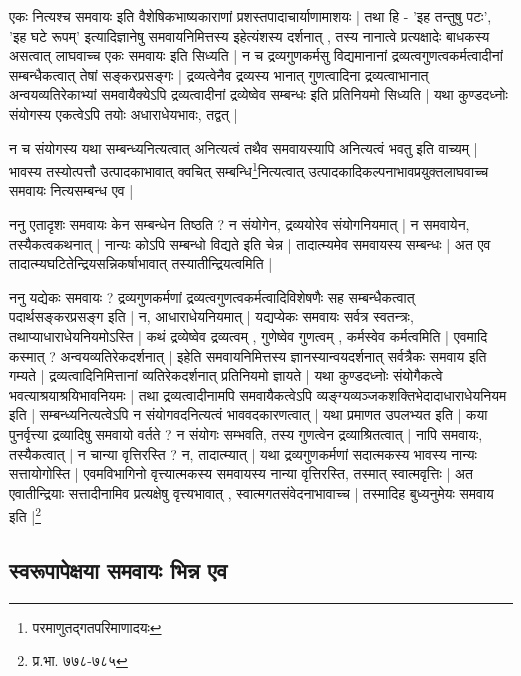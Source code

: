 एकः नित्यश्च समवायः इति वैशेषिकभाष्यकाराणां प्रशस्तपादाचार्याणामाशयः | तथा हि - 'इह तन्तुषु पटः', 'इह घटे रूपम्' इत्यादिज्ञानेषु समवायनिमित्तस्य इहेत्यंशस्य दर्शनात् , तस्य नानात्वे प्रत्यक्षादेः बाधकस्य असत्वात् लाघवाच्च एकः समवायः इति सिध्यति | न च द्रव्यगुणकर्मसु विद्यमानानां द्रव्यत्वगुणत्वकर्मत्वादीनां सम्बन्धैकत्वात् तेषां सङ्करप्रसङ्गः | द्रव्यत्वेनैव द्रव्यस्य भानात् गुणत्वादिना द्रव्यत्वाभानात् अन्वयव्यतिरेकाभ्यां समवायैक्येऽपि द्रव्यत्वादीनां द्रव्येष्वेव सम्बन्धः इति प्रतिनियमो सिध्यति | यथा कुण्डदध्नोः संयोगस्य एकत्वेऽपि तयोः अधाराधेयभावः, तद्वत् | 

न च संयोगस्य यथा सम्बन्ध्यनित्यत्वात् अनित्यत्वं तथैव समवायस्यापि अनित्यत्वं भवतु इति वाच्यम् | भावस्य तस्योत्पत्तौ उत्पादकाभावात् क्वचित् सम्बन्धि\footnote{परमाणुतद्गतपरिमाणादयः}नित्यत्वात् उत्पादकादिकल्पनाभावप्रयुक्तलाघवाच्च समवायः नित्यसम्बन्ध एव | 

ननु एतादृशः समवायः केन सम्बन्धेन तिष्ठति ? न संयोगेन, द्रव्ययोरेव संयोगनियमात् | न समवायेन, तस्यैकत्वकथनात् | नान्यः कोऽपि सम्बन्धो विद्यते इति चेन्न | तादात्म्यमेव समवायस्य सम्बन्धः | अत एव तादात्म्यघटितेन्द्रियसन्निकर्षाभावात् तस्यातीन्द्रियत्वमिति |

{\fontsize{11.7}{0}\selectfont\s ननु यद्येकः समवायः ? द्रव्यगुणकर्मणां द्रव्यत्वगुणत्वकर्मत्वादिविशेषणैः सह सम्बन्धैकत्वात् पदार्थसङ्करप्रसङ्ग इति | न, आधाराधेयनियमात् | यद्यप्येकः समवायः सर्वत्र स्वतन्त्रः, तथाप्याधाराधेयनियमोऽस्ति | कथं द्रव्येष्वेव द्रव्यत्वम् , गुणेष्वेव गुणत्वम् , कर्मस्वेव कर्मत्वमिति | एवमादि कस्मात् ? अन्वयव्यतिरेकदर्शनात् | इहेति समवायनिमित्तस्य ज्ञानस्यान्वयदर्शनात् सर्वत्रैकः समवाय इति गम्यते | द्रव्यत्वादिनिमित्तानां व्यतिरेकदर्शनात् प्रतिनियमो ज्ञायते | यथा कुण्डदध्नोः संयोगैकत्वे भवत्याश्रयाश्रयिभावनियमः | तथा द्रव्यत्वादीनामपि समवायैकत्वेऽपि व्यङ्ग्यव्यञ्जकशक्तिभेदादाधाराधेयनियम इति | सम्बन्ध्यनित्यत्वेऽपि न संयोगवदनित्यत्वं भाववदकारणत्वात् | यथा प्रमाणत उपलभ्यत इति | कया पुनर्वृत्त्या द्रव्यादिषु समवायो वर्तते ? न संयोगः सम्भवति, तस्य गुणत्वेन द्रव्याश्रितत्वात् | नापि समवायः, तस्यैकत्वात् | न चान्या वृत्तिरस्ति ? न, तादात्म्यात् | यथा द्रव्यगुणकर्मणां सदात्मकस्य भावस्य नान्यः सत्तायोगोस्ति | एवमविभागिनो वृत्त्यात्मकस्य समवायस्य नान्या वृत्तिरस्ति, तस्मात् स्वात्मवृत्तिः | अत एवातीन्द्रियाः सत्तादीनामिव प्रत्यक्षेषु वृत्त्यभावात् , स्वात्मगतसंवेदनाभावाच्च | तस्मादिह बुध्यनुमेयः समवाय इति |\footnote{प्र.भा. ७७८-७८५}}

\subsection{स्वरूपापेक्षया समवायः भिन्न एव} 

